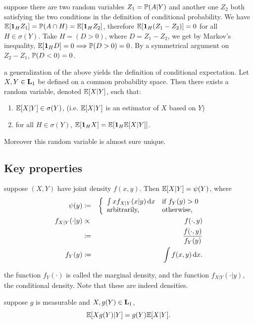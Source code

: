 \documentclass{article}
\begin{document}
 suppose there are two random variables $Z_1 = \P(A|Y)$ and another one $Z_2$ both satisfying the two conditions in the definition of conditional probability. We have $\E[\1_H Z_1] = \P(A\cap H) = \E[\1_H Z_2]$, therefore $\E[\1_H (Z_1 - Z_2)] = 0$ for all $H \in \sigma(Y)$. Take $H = (D > 0)$, where $D = Z_1 - Z_2$, we get by Markov's inequality, $\E[\1_H D] = 0 \Longrightarrow \P(D > 0) = 0$. By a symmetrical argument on $Z_2 - Z_1$, $\P(D < 0) = 0$.

 a generalization of the above yields the definition of conditional expectation.  Let $X, Y \in \L_1$ be defined on a common probability space. Then there exists a random variable, denoted $\E[X|Y]$, such that:
\begin{enumerate}
\item $\E[X|Y] \in \sigma(Y)$, (i.e. $\E[X|Y]$ is an estimator of $X$ based on $Y$)
\item for all $H \in \sigma(Y)$, $\E[ \1_H X ] = \E[ \1_H \E[X|Y] ]$.
\end{enumerate} 
Moreover this random variable is almost sure unique.


\subsection{Key properties}\label{sec:bayes-rule}

 suppose $(X, Y)$ have joint density $f(x,y)$. Then $\E[X|Y] = \psi(Y)$, where 
\begin{eqnarray*} 
\psi(y) &\defeq& \bracearraycond{\int x f_{X|Y}(x|y) \ud x &\text{if }f_Y(y) > 0 \\ \text{arbitrarily,} &\text{otherwise,}} \\
 f_{X|Y}(\cdot|y) &\propto& f(\cdot, y) \\
&\defeq& \frac{f(\cdot,y)}{f_Y(y)} \\
f_Y(y) &\defeq& \int f(x, y) \ud x.
\end{eqnarray*}

 the function $f_Y(\cdot)$ is called the marginal density, and the function $f_{X|Y}(\cdot|y)$, the conditional density. Note that these are indeed densities. 

 suppose $g$ is measurable and $X,g(Y) \in \L_1$, \[ \E[ X g(Y) | Y] = g(Y) \E[X|Y]. \]
\end{document}
